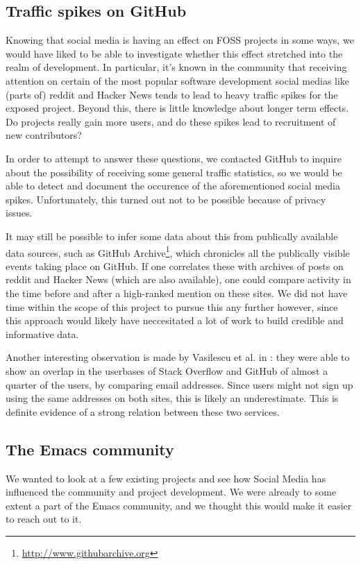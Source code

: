\documentclass[a4paper,11pt]{article} %
\begin{document}
\subsection{Traffic spikes on GitHub}

Knowing that social media is having an effect on FOSS projects in some ways,
we would have liked to be able to investigate whether this effect stretched
into the realm of development. In particular, it's known in the community
that receiving attention on certain of the most popular software development
social medias like (parts of) reddit and Hacker News tends to lead to heavy
traffic spikes for the exposed project. Beyond this, there is little
knowledge about longer term effects. Do projects really gain more users, and
do these spikes lead to recruitment of new contributors?

In order to attempt to answer these questions, we contacted GitHub to
inquire about the possibility of receiving some general traffic statistics,
so we would be able to detect and document the occurence of the
aforementioned social media spikes. Unfortunately, this turned out not to be
possible because of privacy issues.

It may still be possible to infer some data about this from publically
available data sources, such as GitHub
Archive\footnote{\url{http://www.githubarchive.org}}, which chronicles all
the publically visible events taking place on GitHub. If one correlates
these with archives of posts on reddit and Hacker News (which are also
available), one could compare activity in the time before and after a
high-ranked mention on these sites. We did not have time within the scope of
this project to pursue this any further however, since this approach would
likely have neccesitated a lot of work to build credible and informative
data.

Another interesting observation is made by Vasilescu et al. in
\cite{Vasilescu2013Overlap}: they were able to show an overlap in the
userbases of Stack Overflow and GitHub of almost a quarter of the
users, by comparing email addresses. Since users might not sign up
using the same addresses on both sites, this is likely an
underestimate. This is definite evidence of a strong relation between
these two services.

\subsection{The Emacs community}

We wanted to look at a few existing projects and see how Social Media has
influenced the community and project development. We were already to some
extent a part of the Emacs community, and we thought this would make it
easier to reach out to it.
\end{document}
